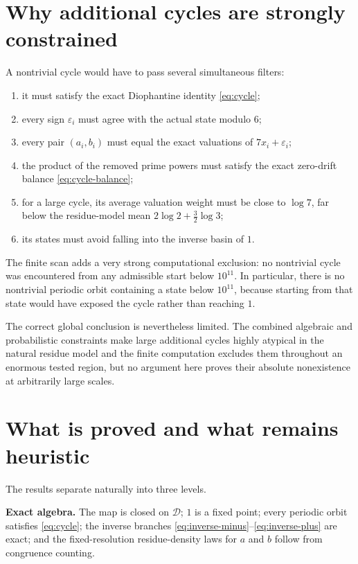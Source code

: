 \documentclass[11pt]{article}
\begin{document}
\section{Why additional cycles are strongly constrained}
A nontrivial cycle would have to pass several simultaneous filters:
\begin{enumerate}[leftmargin=2em]
\item it must satisfy the exact Diophantine identity \eqref{eq:cycle};
\item every sign $\varepsilon_i$ must agree with the actual state modulo $6$;
\item every pair $(a_i,b_i)$ must equal the exact valuations of $7x_i+\varepsilon_i$;
\item the product of the removed prime powers must satisfy the exact zero-drift balance \eqref{eq:cycle-balance};
\item for a large cycle, its average valuation weight must be close to $\log7$, far below the residue-model mean $2\log2+\tfrac32\log3$;
\item its states must avoid falling into the inverse basin of $1$.
\end{enumerate}
The finite scan adds a very strong computational exclusion: no nontrivial cycle was encountered from any admissible start below $10^{11}$. In particular, there is no nontrivial periodic orbit containing a state below $10^{11}$, because starting from that state would have exposed the cycle rather than reaching $1$.

The correct global conclusion is nevertheless limited. The combined algebraic and probabilistic constraints make large additional cycles highly atypical in the natural residue model and the finite computation excludes them throughout an enormous tested region, but no argument here proves their absolute nonexistence at arbitrarily large scales.

\section{What is proved and what remains heuristic}
The results separate naturally into three levels.

\textbf{Exact algebra.} The map is closed on $\mathcal D$; $1$ is a fixed point; every periodic orbit satisfies \eqref{eq:cycle}; the inverse branches \eqref{eq:inverse-minus}--\eqref{eq:inverse-plus} are exact; and the fixed-resolution residue-density laws for $a$ and $b$ follow from congruence counting.
\end{document}
